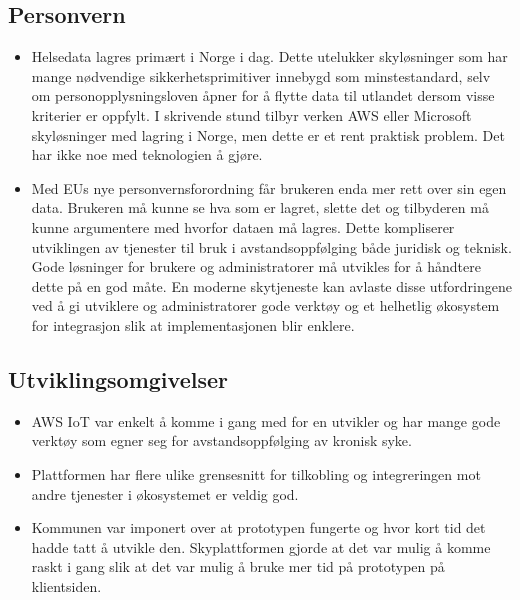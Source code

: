 \subsection{Personvern}
\begin{itemize}
  \item Helsedata lagres primært i Norge i dag. Dette utelukker skyløsninger
  som har mange nødvendige sikkerhetsprimitiver innebygd som minstestandard, selv
  om personopplysningsloven åpner for å flytte data til utlandet dersom visse kriterier er oppfylt.
  I skrivende stund tilbyr verken AWS eller Microsoft skyløsninger med lagring i Norge, men dette er et rent
  praktisk problem. Det har ikke noe med teknologien å gjøre.
  \item Med EUs nye personvernsforordning får brukeren enda mer rett over sin egen data.
  Brukeren må kunne se hva som er lagret, slette det og tilbyderen må kunne argumentere
  med hvorfor dataen må lagres. Dette kompliserer utviklingen av tjenester til bruk i avstandsoppfølging
  både juridisk og teknisk. Gode løsninger for brukere og administratorer må utvikles for å håndtere dette
  på en god måte. En moderne skytjeneste kan avlaste disse utfordringene ved å gi utviklere og administratorer
  gode verktøy og et helhetlig økosystem for integrasjon slik at implementasjonen blir enklere.
\end{itemize}

\subsection{Utviklingsomgivelser}
\begin{itemize}
    \item AWS IoT var enkelt å komme i gang med for en utvikler og har mange gode
        verktøy som egner seg for avstandsoppfølging av kronisk syke.
    \item Plattformen har flere ulike grensesnitt for tilkobling og integreringen
        mot andre tjenester i økosystemet er veldig god.
    \item Kommunen var imponert over
        at prototypen fungerte og hvor kort tid det hadde tatt å utvikle den.
        Skyplattformen gjorde at det var mulig å komme raskt i gang slik at det
        var mulig å bruke mer tid på prototypen på klientsiden.
\end{itemize}

\iffalse
\item Brukere og helsepersonell i avstandsoppfølging fortjener gode og bra utformet løsninger. Det er fortsatt en jobb
        å gjøre på det området. Helsepersonell savner å kunne se grafer av måledata over tid, og kan derfor ikke få så god
        nytte av dataen per i dag. Her må leverandørene jobbe tett sammen med interesseholderne for å møte behovene.
\item Leverandøren av tekniske løsninger må sette seg inn i teknologien som brukes for å gi brukeren en best mulig opplevelse.
        Det gjelder for eksempel å indikere at en måling er ferdig på skjermen til sensoren.
    \item Brukerne sier, i følge Trondheim kommune, at de synes HelsaMi+ er enkelt å bruke.
\fi


